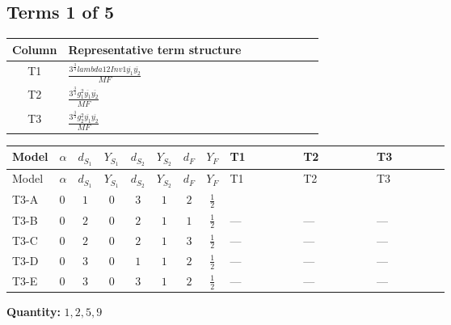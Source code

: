 \documentclass[8pt]{article}
\begin{document}
\begin{landscape}
\subsection*{Terms 1 of 5}
\begin{center}
\begin{tabular}{@{}c >{\raggedright\arraybackslash}p{0.82\linewidth}@{}}
\toprule
Column & Representative term structure \\
\midrule
T1 & \(\displaystyle \frac{3^{\frac{3}{4}} lambda12Inv1 \overline{y_{1}} \overline{y_{2}}}{MF}\) \\
\midrule
T2 & \(\displaystyle \frac{3^{\frac{3}{4}} g_{1}^{2} \overline{y_{1}} \overline{y_{2}}}{MF}\) \\
\midrule
T3 & \(\displaystyle \frac{3^{\frac{3}{4}} g_{2}^{2} \overline{y_{1}} \overline{y_{2}}}{MF}\) \\
\midrule
\bottomrule
\end{tabular}
\end{center}
\smallskip
\tiny
\begin{longtable}{@{}llcccccc >{\raggedright\arraybackslash}p{0.21\linewidth} >{\raggedright\arraybackslash}p{0.21\linewidth} >{\raggedright\arraybackslash}p{0.21\linewidth}@{}}
\toprule
Model & $\alpha$ & $d_{S_1}$ & $Y_{S_1}$ & $d_{S_2}$ & $Y_{S_2}$ & $d_F$ & $Y_F$ & T1 & T2 & T3 \\
\midrule
\endfirsthead
\toprule
Model & $\alpha$ & $d_{S_1}$ & $Y_{S_1}$ & $d_{S_2}$ & $Y_{S_2}$ & $d_F$ & $Y_F$ & T1 & T2 & T3 \\
\midrule
\endhead
T3-A & $0$ & $1$ & $0$ & $3$ & $1$ & $2$ & $\frac{1}{2}$ & \scriptsize\adjustbox{max width=\linewidth}{$\begin{gathered} \frac{3^{\frac{3}{4}} lambda12Inv1 \overline{y_{1}} \overline{y_{2}}}{6 MF}\end{gathered}$} & \scriptsize\adjustbox{max width=\linewidth}{$\begin{gathered} \frac{3^{\frac{3}{4}} g_{1}^{2} \overline{y_{1}} \overline{y_{2}}}{8 MF}\end{gathered}$} & \scriptsize\adjustbox{max width=\linewidth}{$\begin{gathered} \frac{25 \cdot 3^{\frac{3}{4}} g_{2}^{2} \overline{y_{1}} \overline{y_{2}}}{24 MF}\end{gathered}$} \\
\midrule
T3-B & $0$ & $2$ & $0$ & $2$ & $1$ & $1$ & $\frac{1}{2}$ & --- & --- & --- \\
\midrule
T3-C & $0$ & $2$ & $0$ & $2$ & $1$ & $3$ & $\frac{1}{2}$ & --- & --- & --- \\
\midrule
T3-D & $0$ & $3$ & $0$ & $1$ & $1$ & $2$ & $\frac{1}{2}$ & --- & --- & --- \\
\midrule
T3-E & $0$ & $3$ & $0$ & $3$ & $1$ & $2$ & $\frac{1}{2}$ & --- & --- & --- \\
\midrule
\bottomrule
\end{longtable}
\clearpage
\noindent\textbf{Quantity: }$\mathrm{1,2,5,9}$\par\smallskip

\end{landscape}
\end{document}
